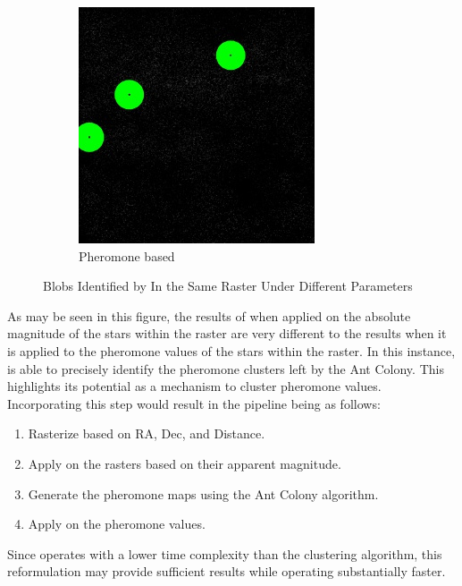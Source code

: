 \begin{figure}[H]
\begin{subfigure}[b]{0.49\textwidth}
        \includegraphics[width=\textwidth,height=\textwidth]{./figures/blob-dog/a4-0.0-58.0-pheromone-based-blobs.jpg}
        \caption{Pheromone based}
        \label{fig:pher-based}
    \end{subfigure}
    \caption{Blobs Identified by \blobdog{} In the Same Raster Under Different Parameters}
    \label{fig:mag-and-pher-based-DoG}
\end{figure}
As may be seen in this figure, the results of \blobdog{} when applied on the
absolute magnitude of the stars within the raster are very different to the
results when it is applied to the pheromone values of the stars within the
raster. In this instance, \blobdog{} is able to precisely identify the pheromone
clusters left by the Ant Colony. This highlights its potential as a mechanism to
cluster pheromone values. Incorporating this step would result in the pipeline
being as follows:
\begin{enumerate}
    \item Rasterize based on RA, Dec, and Distance.
    \item Apply \blobdog{} on the rasters based on their apparent magnitude.
    \item Generate the pheromone maps using the Ant Colony algorithm.
    \item Apply \blobdog{} on the pheromone values.
\end{enumerate}
Since \blobdog{} operates with a lower time complexity than the clustering
algorithm, this reformulation may provide sufficient results while operating
substantially faster.

